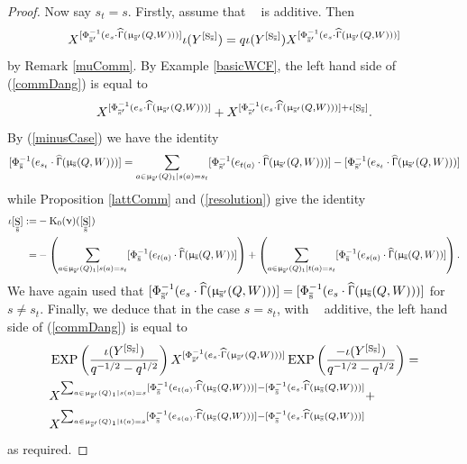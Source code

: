 \documentclass[a4paper,10pt]{amsart}
\DeclareMathOperator{\Simp}{S}
\renewcommand{\Gamma}{\Upgamma}
\renewcommand{\nu}{\upnu}
\renewcommand{\mu}{\upmu}
\DeclareMathOperator{\KK}{K_0}
\DeclareMathOperator{\HGamma}{\widehat{\Gamma}}
\DeclareMathOperator{\EXP}{EXP}
\DeclareMathOperator{\Ss}{\overline{s}}
\newcommand{\pleth}[1]{\EXP\left(#1\right)}
\begin{document}
\begin{proof}
Now say $s_t=s$.  Firstly, assume that $\Ss$ is additive.  Then
\[
X^{[\Phi^{-1}_{\Ss'}(e_s\cdot \HGamma(\mu_{\Ss'}(Q,W)))]} \iota(Y^{[\Simp_{\Ss}]})= q\iota(Y^{[\Simp_{\Ss}]}) X^{[\Phi^{-1}_{\Ss'}(e_s\cdot \HGamma(\mu_{\Ss'}(Q,W)))]}
\]
by Remark \ref{muComm}.  By Example \ref{basicWCF}, the left hand side of (\ref{commDang}) is equal to
\[
X^{[\Phi^{-1}_{\Ss'}(e_s\cdot \HGamma(\mu_{\Ss'}(Q,W)))]}+X^{[\Phi^{-1}_{\Ss'}(e_s\cdot \HGamma(\mu_{\Ss'}(Q,W)))]+\iota[\Simp_{\Ss}]}.
\]
By (\ref{minusCase}) we have the identity
\[
[\Phi^{-1}_{\Ss}(e_{s_t}\cdot \HGamma(\mu_{\Ss}(Q,W)))]=\sum_{a\in \mu_{\Ss'}(Q)_1|s(a)=s_t}[\Phi_{\Ss'}^{-1}(e_{t(a)}\cdot \HGamma(\mu_{\Ss'}(Q,W)))]-[\Phi^{-1}_{\Ss'}(e_{s_t}\cdot \HGamma(\mu_{\Ss'}(Q,W)))]
\]
while Proposition \ref{lattComm} and (\ref{resolution}) give the identity
\begin{align}\label{Sid}
\iota[\Simp_{\Ss}]:=&{}-\KK(\nu)([\Simp_{\Ss}])\\=&-\left(\sum_{a\in \mu_{\Ss'}(Q)_1|s(a)=s_t}[\Phi_{\Ss}^{-1}(e_{t(a)}\cdot \HGamma(\mu_{\Ss}(Q,W))]\right)+\left(\sum_{a\in \mu_{\Ss'}(Q)_1|t(a)=s_t}[\Phi_{\Ss}^{-1}(e_{s(a)}\cdot \HGamma(\mu_{\Ss}(Q,W))]\right).\nonumber
\end{align}
We have again used that $[\Phi_{\Ss'}^{-1}(e_{s}\cdot \HGamma(\mu_{\Ss'}(Q,W)))]=[\Phi_{\Ss}^{-1}(e_{s}\cdot \HGamma(\mu_{\Ss}(Q,W)))]$ for $s\neq s_t$.  Finally, we deduce that in the case $s=s_t$, with $\Ss$ additive, the left hand side of (\ref{commDang}) is equal to
\begin{align}\label{desClus}
&\pleth{\frac{\iota(Y^{[\Simp_{\Ss}]})}{q^{-1/2}-q^{1/2}}}X^{[\Phi^{-1}_{\Ss'}(e_s\cdot \HGamma(\mu_{\Ss'}(Q,W)))]}\pleth{\frac{-\iota(Y^{[\Simp_{\Ss}]})}{q^{-1/2}-q^{1/2}}}=\\
\nonumber
&X^{\sum_{a\in \mu_{\Ss'}(Q)_1|s(a)=s}[\Phi_{\Ss}^{-1}(e_{t(a)}\cdot \HGamma(\mu_{\Ss}(Q,W)))]-[\Phi_{\Ss}^{-1}(e_{s}\cdot\HGamma(\mu_{\Ss}(Q,W)))]}+\\
&X^{\sum_{a\in \mu_{\Ss'}(Q)_1|t(a)=s}[\Phi_{\Ss}^{-1}(e_{s(a)}\cdot \HGamma(\mu_{\Ss}(Q,W)))]-[\Phi_{\Ss}^{-1}(e_{s}\cdot\HGamma(\mu_{\Ss}(Q,W)))]}\nonumber
\end{align}
as required.


\end{proof}
\end{document}
